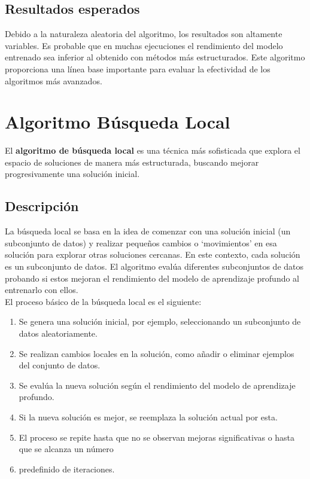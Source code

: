 \subsection{Resultados esperados}\label{subsec:resultados-esperados}
Debido a la naturaleza aleatoria del algoritmo, los resultados son altamente variables.
Es probable que en muchas ejecuciones el rendimiento del modelo entrenado sea inferior al obtenido con métodos más
estructurados.
Este algoritmo proporciona una línea base importante para evaluar la efectividad de los algoritmos más avanzados.


\section{Algoritmo Búsqueda Local}\label{sec:algoritmo-busqueda-local}
El \textbf{algoritmo de búsqueda local} es una técnica más sofisticada que explora el espacio de soluciones de manera
más estructurada, buscando mejorar progresivamente una solución inicial.

\subsection{Descripción}\label{subsec:descripcion2}
La búsqueda local se basa en la idea de comenzar con una solución inicial (un subconjunto de datos) y realizar pequeños
cambios o `movimientos' en esa solución para explorar otras soluciones cercanas.
En este contexto, cada solución es un subconjunto de datos.
El algoritmo evalúa diferentes subconjuntos de datos probando si estos mejoran el rendimiento del modelo de aprendizaje
profundo al entrenarlo con ellos. \\[6pt]

El proceso básico de la búsqueda local es el siguiente:
\begin{enumerate}
    \item Se genera una solución inicial, por ejemplo, seleccionando un subconjunto de datos aleatoriamente.
    \item Se realizan cambios locales en la solución, como añadir o eliminar ejemplos del conjunto de datos.
    \item Se evalúa la nueva solución según el rendimiento del modelo de aprendizaje profundo.
    \item Si la nueva solución es mejor, se reemplaza la solución actual por esta.
    \item El proceso se repite hasta que no se observan mejoras significativas o hasta que se alcanza un número
    \item predefinido de iteraciones.
\end{enumerate}

